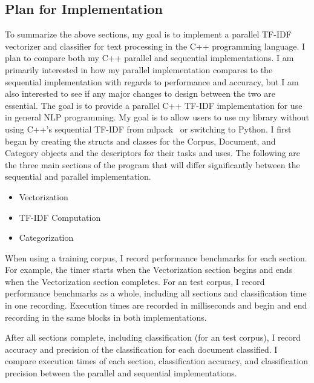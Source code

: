 \documentclass[conference]{IEEEtran}
\begin{document}
\subsection{Plan for Implementation}
To summarize the above sections, my goal is to implement a parallel TF-IDF vectorizer and classifier for text processing in the C++ programming language. I plan to compare both my C++ parallel and sequential implementations. I am primarily interested in how my parallel implementation compares to the sequential implementation with regards to performance and accuracy, but I am also interested to see if any major changes to design between the two are essential. The goal is to provide a parallel C++ TF-IDF implementation for use in general NLP programming. My goal is to allow users to use my library without using C++’s sequential TF-IDF from mlpack~\cite{b3} or switching to Python. I first began by creating the structs and classes for the Corpus, Document, and Category objects and the descriptors for their tasks and uses. The following are the three main sections of the program that will differ significantly between the sequential and parallel implementation.

\begin{itemize}
    \item Vectorization
    \item TF-IDF Computation
    \item Categorization
\end{itemize}

When using a training corpus, I record performance benchmarks for each section. For example, the timer starts when the Vectorization section begins and ends when the Vectorization section completes. For an test corpus, I record performance benchmarks as a whole, including all sections and classification time in one recording. Execution times are recorded in milliseconds and begin and end recording in the same blocks in both implementations.

After all sections complete, including classification (for an test corpus), I record accuracy and precision of the classification for each document classified. I compare execution times of each section, classification accuracy, and classification precision between the parallel and sequential implementations. 
\end{document}
